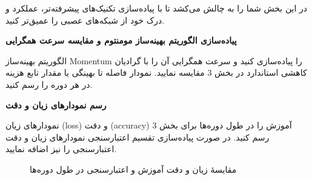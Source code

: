 \documentclass[12pt]{exam}
\begin{document}
	
	\vspace{1em}
	
	در این بخش شما را به چالش می‌کشد تا با پیاده‌سازی تکنیک‌های پیشرفته‌تر، عملکرد و درک خود از شبکه‌های عصبی را عمیق‌تر کنید.
	
	\begin{questions}
		
		\question
		\textbf{پیاده‌سازی الگوریتم بهینه‌ساز مومنتوم و مقایسه سرعت همگرایی}
		
		الگوریتم بهینه‌ساز Momentum را پیاده‌سازی کنید و سرعت همگرایی آن را با گرادیان کاهشی استاندارد در بخش 3 مقایسه نمایید. نمودار فاصله تا بهینگی یا مقدار تابع هزینه در هر دوره را رسم کنید.

		
		
		
		\question
		\textbf{رسم نمودارهای زیان و دقت}
		
		نمودارهای زیان (loss) و دقت (accuracy) آموزش را در طول دوره‌ها برای بخش 3 رسم کنید. در صورت پیاده‌سازی تقسیم اعتبارسنجی  نمودارهای زیان و دقت اعتبارسنجی را نیز اضافه نمایید.
		
		
		
		\begin{figure}[H]
			\centering
			\quad
			\caption{مقایسهٔ زیان و دقت آموزش و اعتبارسنجی در طول دوره‌ها}
			\label{fig:loss_acc_plots}
		\end{figure}
		

\end{questions}
\end{document}
